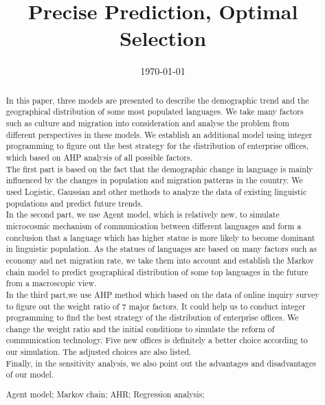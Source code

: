 \documentclass{mcmthesis}
\begin{document}
\title{Precise Prediction, Optimal Selection}
\date{\today}
\begin{abstract}
\hspace*{1mm}In this paper, three models are presented to describe the demographic trend and the geographical distribution of some most populated languages. We take many factors such as culture and migration into consideration and analyse the problem from different perspectives in these models. We establish an additional model using integer programming to figure out the best strategy for the distribution of enterprise offices, which based on AHP analysis of all possible factors.\\
\hspace*{8mm}The first part is based on the fact that the demographic change in language is mainly influenced by the changes in population and migration patterns in the country. We used Logistic, Gaussian and other methods to analyze the data of existing linguistic populations and predict future trends.\\
\hspace*{8mm}In the second part, we use Agent model, which is relatively new, to simulate microcosmic mechanism of communication between different languages and form a conclusion that a language which has higher statue is more likely to become dominant in linguistic population. As the statues of languages are based on many factors such as economy and net migration rate, we take them into account and establish the Markov chain model to predict geographical distribution of some top languages in the future from a macroscopic view.\\
\hspace*{8mm}In the third part,we use AHP method which based on the data of online inquiry survey to figure out the weight ratio of 7 major factors. It could help us to conduct integer programming to find the best strategy of the distribution of enterprise offices. We change the weight ratio and the initial conditions to simulate the reform of communication technology. Five new offices is definitely a better choice according to our simulation. The adjusted choices are also listed.\\
\hspace*{8mm}Finally, in the sensitivity analysis, we also point out the advantages and disadvantages of our model.
\begin{keywords}
Agent model; Markov chain; AHR; Regression analysis;
\end{keywords}
\end{abstract}
\maketitle
\end{document}
